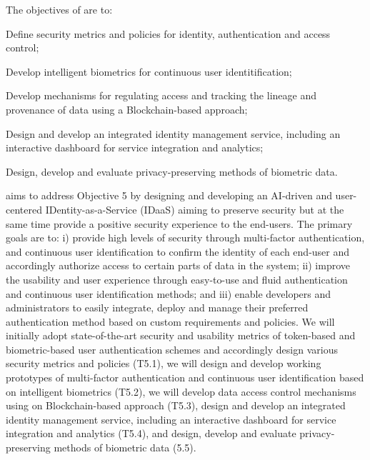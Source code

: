 \addtocounter{wpno}{1}
\begin{Workpackage}{\thewpno}
\WPTitle{\wpname{\thewpno}}

\begin{WPObjectives}
The objectives of \theWP{} are to:
\begin{compactitem}
\item Define security metrics and policies for identity, authentication and access control;
\item Develop intelligent biometrics for continuous user identitification;
\item Develop mechanisms for regulating access and tracking the lineage and provenance of data using a Blockchain-based approach;
\item Design and develop an integrated identity management service, including an interactive dashboard for service integration and analytics;
\item Design, develop and evaluate privacy-preserving methods of biometric data.
\end{compactitem}
\end{WPObjectives}

\begin{WPDescription}
\theWP{} aims to address Objective 5 by designing and developing an AI-driven and user-centered IDentity-as-a-Service (IDaaS) aiming to preserve security but at the same time provide a positive security experience to the end-users. The primary goals are to: i) provide high levels of security through multi-factor authentication, and continuous user identification to confirm the identity of each end-user and accordingly authorize access to certain parts of data in the system; ii) improve the usability and user experience through easy-to-use and fluid authentication and continuous user identification methods; and iii) enable developers and administrators to easily integrate, deploy and manage their preferred authentication method based on custom requirements and policies. We will initially adopt state-of-the-art security and usability metrics of token-based and biometric-based user authentication schemes and accordingly design various security metrics and policies (T5.1), we will design and develop working prototypes of multi-factor authentication and continuous user identification based on intelligent biometrics (T5.2), we will develop data access control mechanisms using on Blockchain-based approach (T5.3), design and develop an integrated identity management service, including an interactive dashboard for service integration and analytics (T5.4), and design, develop and evaluate privacy-preserving methods of biometric data (5.5).


\end{WPDescription}
\end{Workpackage}
